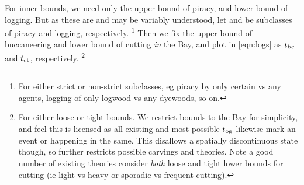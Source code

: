 		For inner bounds, we need only the upper bound of piracy, and lower bound of logging. But as these are and may be variably understood, let  and  be subclasses of piracy and logging, respectively.%
		\footnote{For either strict or non-strict subclasses, eg piracy by only certain vs any agents, logging of only logwood vs any dyewoods, so on.}
		Then we fix the upper bound of buccaneering and lower bound of cutting \emph{in} the Bay, and plot in \ref{eqn:logs} as \(t_{\operatorname{bc}}\) and \(t_{\operatorname{ct}}\), respectively.%
		\footnote{For either loose or tight bounds. We restrict bounds to the Bay for simplicity, and feel this is licensed as all existing and most possible \(t_{\operatorname{og}}\) likewise mark an event or happening in the same. This disallows a spatially discontinuous state though, so further restricts possible carvings and theories. Note a good number of existing theories consider \emph{both} loose and tight lower bounds for cutting (ie light vs heavy or sporadic vs frequent cutting).}
		
